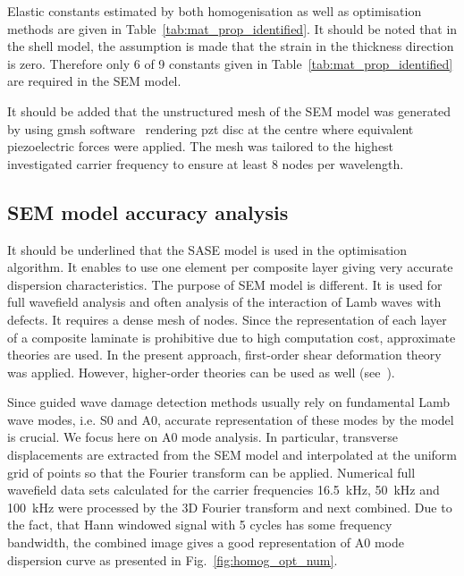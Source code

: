\documentclass[preprint,12pt]{elsarticle}
\begin{document}
Elastic constants estimated by both homogenisation as well as optimisation methods are given in Table~\ref{tab:mat_prop_identified}. 
It should be noted that in the shell model, the assumption is made that the strain in the thickness direction is zero. 
Therefore only 6 of 9 constants given in Table~\ref{tab:mat_prop_identified} are required in the SEM model.

It should be added that the unstructured mesh of the SEM model was generated by using gmsh software~\cite{Geuzaine2009} rendering pzt disc at the centre where equivalent piezoelectric forces were applied. 
The mesh was tailored to the highest investigated carrier frequency to ensure at least 8 nodes per wavelength.

\subsection{SEM model accuracy analysis}
It should be underlined that the SASE model is used in the optimisation algorithm. 
It enables to use one element per composite layer giving very accurate dispersion characteristics. The purpose of SEM model is different. 
It is used for full wavefield analysis and often analysis of the interaction of Lamb waves with defects. 
It requires a dense mesh of nodes. 
Since the representation of each layer of a composite laminate is prohibitive due to high computation cost, approximate theories are used. 
In the present approach, first-order shear deformation theory was applied. 
However, higher-order theories can be used as well (see~\cite{Ostachowicz2012}).

Since guided wave damage detection methods usually rely on fundamental Lamb wave modes, i.e. S0 and A0, accurate representation of these modes by the model is crucial.
We focus here on A0 mode analysis. 
In particular, transverse displacements are extracted from the SEM model and interpolated at the uniform grid of points so that the Fourier transform can be applied. 
Numerical full wavefield data sets calculated for the carrier frequencies 16.5~kHz, 50~kHz and 100~kHz were processed by the 3D Fourier transform and next combined. 
Due to the fact, that Hann windowed signal with 5 cycles has some frequency bandwidth, the combined image gives a good representation of A0 mode dispersion curve as presented in Fig.~\ref{fig:homog_opt_num}. 
\end{document}
